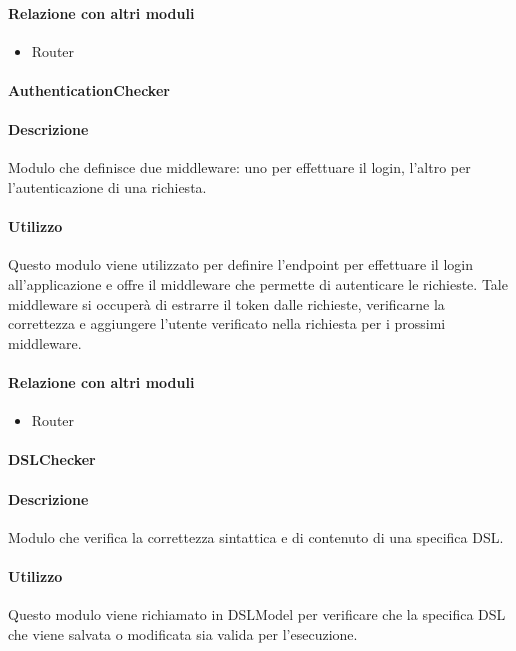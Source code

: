 \paragraph*{Relazione con altri moduli}
\begin{itemize}
\item Router
\end{itemize}

\paragraph{AuthenticationChecker}
\paragraph*{Descrizione}
Modulo che definisce due middleware: uno per effettuare il login, l'altro per l'autenticazione di una richiesta.

\paragraph*{Utilizzo}
Questo modulo viene utilizzato per definire l'endpoint per effettuare il login all'applicazione e offre il middleware che permette di autenticare le richieste. Tale middleware si occuperà di estrarre il token dalle richieste, verificarne la correttezza e aggiungere l'utente verificato nella richiesta per i prossimi middleware.

\paragraph*{Relazione con altri moduli}
\begin{itemize}
\item Router
\end{itemize}

\paragraph{DSLChecker}
\paragraph*{Descrizione}
Modulo che verifica la correttezza sintattica e di contenuto di una specifica DSL.

\paragraph*{Utilizzo}
Questo modulo viene richiamato in DSLModel per verificare che la specifica DSL che viene salvata o modificata sia valida per l'esecuzione.

